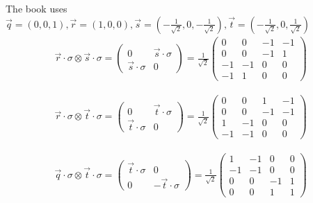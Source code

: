 \documentclass[aspectratio=1610]{beamer}					%
\begin{document}
\begin{frame}
The book uses $\vec{q} = (0,0,1), \vec{r} = (1,0,0), \vec{s} = (-\frac{1}{\sqrt{2}},0,-\frac{1}{\sqrt{2}}), \vec{t} = (-\frac{1}{\sqrt{2}},0,\frac{1}{\sqrt{2}})$
\begin{align*}
\vec{r}\cdot\sigma\otimes\vec{s}\cdot\sigma = 
\begin{pmatrix}
0 & \vec{s}\cdot\sigma\\
\vec{s}\cdot\sigma & 0
\end{pmatrix} = 
\frac{1}{\sqrt{2}}\begin{pmatrix}
0 & 0 & -1 & -1\\
0 & 0 & -1 & 1\\
-1 & -1 & 0 & 0 \\
-1 & 1 & 0 & 0
\end{pmatrix}
\end{align*}

\begin{align*}
\vec{r}\cdot\sigma\otimes\vec{t}\cdot\sigma = 
\begin{pmatrix}
0 & \vec{t}\cdot\sigma \\
\vec{t}\cdot\sigma & 0
\end{pmatrix} = 
\frac{1}{\sqrt{2}}\begin{pmatrix}
0 & 0 & 1 & -1\\
0 & 0 & -1 & -1\\
1 & -1 & 0 & 0 \\
-1 & -1 & 0 & 0
\end{pmatrix}
\end{align*}

\begin{align*}
\vec{q}\cdot\sigma\otimes\vec{t}\cdot\sigma = 
\begin{pmatrix}
\vec{t}\cdot\sigma & 0\\
0 & -\vec{t}\cdot\sigma
\end{pmatrix} = 
\frac{1}{\sqrt{2}}\begin{pmatrix}
1 & -1 & 0 & 0\\
-1 & -1 & 0 & 0\\
0 & 0 & -1 & 1 \\
0 & 0 & 1 & 1
\end{pmatrix}
\end{align*}
\end{frame}
\end{document}
